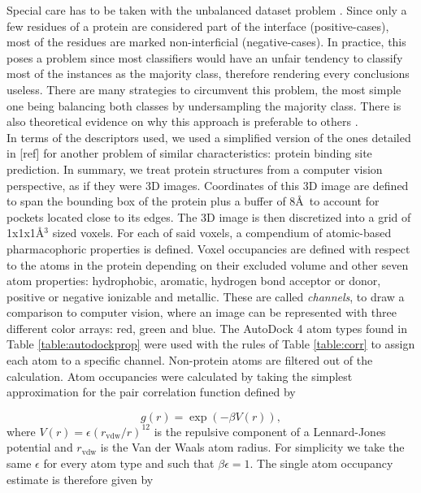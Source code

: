 \documentclass[10pt,a4paper,twoside]{book}
\begin{document}
Special care has to be taken with the unbalanced dataset problem \cite{Longadge2013}. Since only a few residues of a protein are considered part of the interface (positive-cases), most of the residues are marked non-interficial (negative-cases). In practice, this poses a problem since most classifiers would have an unfair tendency to classify most of the instances as the majority class, therefore rendering every conclusions useless. There are many strategies to circumvent this problem, the most simple one being balancing both classes by undersampling the majority class. There is also theoretical evidence on why this approach is preferable to others \cite{Wallace2011}.  \\ 

In terms of the descriptors used, we used a simplified version of the ones detailed in [ref] for another problem of similar characteristics: protein binding site prediction. In summary, we treat protein structures from a computer vision perspective, as if they were 3D images. Coordinates of this 3D image are defined to span the bounding box of the protein plus a buffer of 8\AA\ to account for pockets located close to its edges. The 3D image is then discretized into a grid of 1x1x1\AA$^3$ sized voxels. For each of said voxels, a compendium of atomic-based pharmacophoric properties is defined. Voxel occupancies are defined with respect to the atoms in the protein depending on their excluded volume and other seven atom properties: hydrophobic, aromatic, hydrogen bond acceptor or donor, positive or negative ionizable and metallic. These are called \textit{channels}, to draw a comparison to computer vision, where an image can be represented with three different color arrays: red, green and blue. The AutoDock 4 \cite{Morris2009} atom types found in Table \ref{table:autodockprop} were used with the rules of Table \ref{table:corr} to assign each atom to a specific channel. Non-protein atoms are filtered out of the calculation. Atom occupancies were calculated by taking the simplest approximation for the pair correlation function defined by


\begin{equation}
    g(r) = \exp\left(-\beta V(r)\right), \label{gr_eq}
\end{equation}
where $V(r)=\epsilon (r_\mathrm{vdw}/r)^{12}$ is the repulsive component of a Lennard-Jones potential and $r_{\mathrm{vdw}}$ is the Van der Waals atom radius. For simplicity we take the same $\epsilon$ for every atom type and such that $\beta \epsilon=1$. The single atom occupancy estimate is therefore given by
\end{document}
